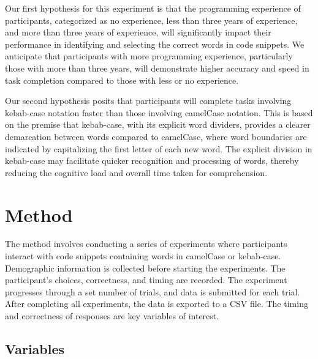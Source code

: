 \documentclass{article}
\begin{document}
\begin{tcolorbox}[title=Hypotheses]
    Our first hypothesis for this experiment is that the programming experience of participants, categorized as no experience, less than three years of experience, and more than three years of experience, will significantly impact their performance in identifying and selecting the correct words in code snippets. We anticipate that participants with more programming experience, particularly those with more than three years, will demonstrate higher accuracy and speed in task completion compared to those with less or no experience.

    Our second hypothesis posits that participants will complete tasks involving kebab-case notation faster than those involving camelCase notation. This is based on the premise that kebab-case, with its explicit word dividers, provides a clearer demarcation between words compared to camelCase, where word boundaries are indicated by capitalizing the first letter of each new word. The explicit division in kebab-case may facilitate quicker recognition and processing of words, thereby reducing the cognitive load and overall time taken for comprehension.
\end{tcolorbox}




\section{Method}
The method involves conducting a series of experiments where participants interact with code snippets containing words in camelCase or kebab-case. Demographic information is collected before starting the experiments. The participant's choices, correctness, and timing are recorded. The experiment progresses through a set number of trials, and data is submitted for each trial. After completing all experiments, the data is exported to a CSV file. The timing and correctness of responses are key variables of interest.
\subsection{Variables}
\end{document}

